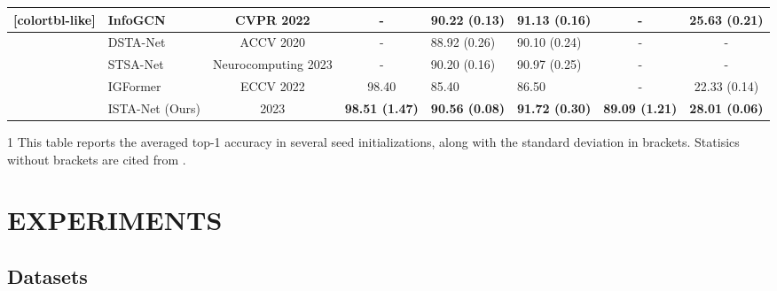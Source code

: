 \documentclass[letterpaper, 10 pt, conference]{ieeeconf}
\begin{document}
\begin{table*}[t]
{\begin{threeparttable}
{\begin{NiceTabular}{c|l|c|c|C{22mm}|C{22mm}|c|c}[colortbl-like]
            &
            InfoGCN\cite{InfoGCN2022}&
            CVPR 2022&
            -&
            90.22 (0.13)&
            91.13 (0.16)&
            -&
            25.63 (0.21)\\

            \hline

            &
            DSTA-Net\cite{dstanet2020}&
            ACCV 2020&
            -&
            88.92 (0.26)&
            90.10 (0.24)&
            -&
            -\\

            &
            STSA-Net\cite{STSA-Net2023}&
            Neurocomputing 2023&
            -&
            90.20 (0.16)&
            90.97 (0.25)&
            -&
            -\\

            &
            IGFormer\cite{igformer2022}&
            ECCV 2022&
            98.40&
            85.40&
            86.50&
            -&
            22.33 (0.14)\\

            &
            ISTA-Net (Ours)&
            2023&
            \textbf{98.51 (1.47)}&
            \textbf{90.56 (0.08)}&
            \textbf{91.72 (0.30)}&
            \textbf{89.09 (1.21)}&
            \textbf{28.01 (0.06)}\\
		
		\hline
	\end{NiceTabular}
        }
        \begin{tablenotes}
         \item[1] This table reports the averaged top-1 accuracy in several seed initializations, along with the standard deviation in brackets. Statisics without brackets are cited from \cite{igformer2022, H2O_TA-GCN2021, Assembly101}.
       \end{tablenotes}
       \end{threeparttable}
        }
        \vspace{-1.0em}
\end{table*}

\section{EXPERIMENTS}
\subsection{Datasets}
\end{document}
